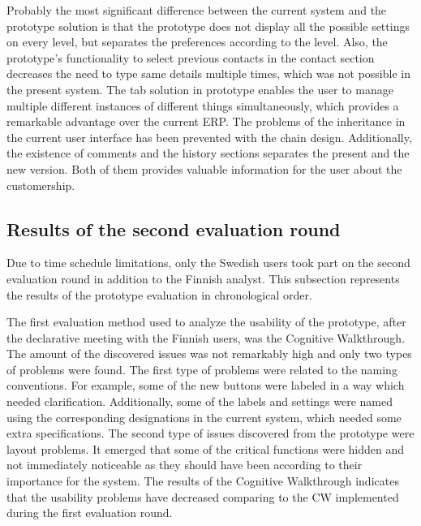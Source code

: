 \documentclass[12pt,a4paper,oneside,pdftex]{report}
\begin{document}
Probably the most significant difference between the current system and the prototype solution is that the prototype does not display all the possible settings on every level, but separates the preferences according to the level. Also, the prototype's functionality to select previous contacts in the contact section decreases the need to type same details multiple times, which was not possible in the present system. The tab solution in prototype enables the user to manage multiple different instances of different things simultaneously, which provides a remarkable advantage over the current ERP. The problems of the inheritance in the current user interface has been prevented with the chain design. Additionally, the existence of comments and the history sections separates the present and the new version. Both of them provides valuable information for the user about the customership.

\subsection{Results of the second evaluation round}

Due to time schedule limitations, only the Swedish users took part on the second evaluation round in addition to the Finnish analyst. This subsection represents the results of the prototype evaluation in chronological order. 

The first evaluation method used to analyze the usability of the prototype, after the declarative meeting with the Finnish users, was the Cognitive Walkthrough. The amount of the discovered issues was not remarkably high and only two types of problems were found. The first type of problems were related to the naming conventions. For example, some of the new buttons were labeled in a way which needed clarification. Additionally, some of the labels and settings were named using the corresponding designations in the current system, which needed some extra specifications. The second type of issues discovered from the prototype were layout problems. It emerged that some of the critical functions were hidden and not immediately noticeable as they should have been according to their importance for the system. The results of the Cognitive Walkthrough indicates that the usability problems have decreased comparing to the CW implemented during the first evaluation round.
\end{document}
